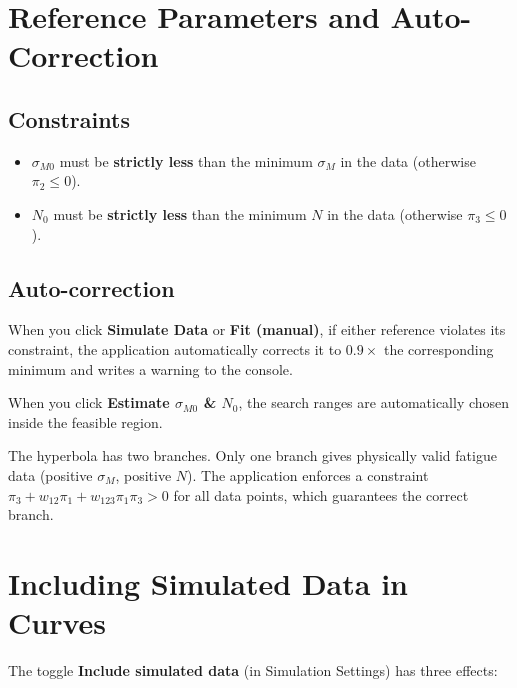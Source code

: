 \documentclass[11pt,a4paper]{article}
\newcommand{\piz}{\ensuremath{\pi_3}}
\newcommand{\pit}{\ensuremath{\pi_2}}
\newcommand{\pio}{\ensuremath{\pi_1}}
\newcommand{\sM}{\ensuremath{\sigma_M}}
\newcommand{\sMzero}{\ensuremath{\sigma_{M0}}}
\newcommand{\Nzero}{\ensuremath{N_0}}
\begin{document}
\section{Reference Parameters and Auto-Correction}

\subsection{Constraints}

\begin{itemize}[leftmargin=1.4em]
  \item $\sMzero$ must be \textbf{strictly less} than the minimum $\sM$ in the data (otherwise $\pit \le 0$).
  \item $\Nzero$ must be \textbf{strictly less} than the minimum $N$ in the data (otherwise $\piz \le 0$).
\end{itemize}

\subsection{Auto-correction}

When you click \textbf{Simulate Data} or \textbf{Fit (manual)}, if either reference violates its constraint, the application automatically corrects it to $0.9\times$ the corresponding minimum and writes a warning to the console.

When you click \textbf{Estimate $\sMzero$ \& $\Nzero$}, the search ranges are automatically chosen inside the feasible region.

\begin{notebox}
The hyperbola has two branches. Only one branch gives physically valid fatigue data (positive $\sM$, positive $N$). The application enforces a constraint $\piz + w_{12}\pio + w_{123}\pio\piz > 0$ for all data points, which guarantees the correct branch.
\end{notebox}

\section{Including Simulated Data in Curves}
\label{sec:include-sim}

The toggle \textbf{Include simulated data} (in Simulation Settings) has three effects:
\end{document}
